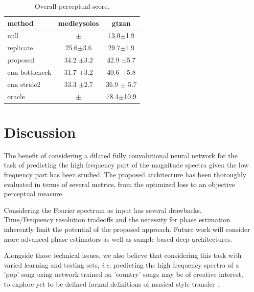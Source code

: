 \documentclass{article}
\newcommand{\fg}[1]{\textcolor{red}{FG : #1}}
\begin{document}
\begin{table}[t]
\begin{center}
\begin{tabular}{lcc}
method & medleysolos & gtzan \\
\hline
null & $\pm$ & 13.0$\pm$1.9  \\
replicate & 25.6$\pm$3.6 & 29.7$\pm$4.9 \\
\hline
proposed & 34.2 $\pm$3.2 & 42.9 $\pm$5.7 \\
cnn-bottleneck & 31.7 $\pm$3.2 & 40.6 $\pm$5.8 \\
cnn stride2 & 33.3 $\pm$2.7 & 36.9 $\pm$ 5.7 \\
\hline
oracle  & $\pm$ & 78.4$\pm$10.9  \\
\end{tabular}
\caption{Overall perceptual score.}
\end{center}
\label{tab:ops}
\vspace{-4mm}
\end{table}

\section{Discussion}
\label{sec:discussion}

The benefit of considering a dilated fully convolutional neural network for the task of predicting the high frequency part of the magnitude spectra given the low frequency part has been studied. The proposed architecture has been thoroughly evaluated in terms of several metrics, from the optimized loss to an objective perceptual measure.

Considering the Fourier spectrum as input has several drawbacks. Time/Frequency resolution tradeoffs and the necessity for phase estimation inherently limit the potential of the proposed approach. Future work will consider more advanced phase estimators as well as sample based deep architectures. %




Alongside those technical issues, we also believe that considering this task with varied learning and testing sets, \textit{i.e.} predicting the high frequency spectra of a 'pop' song using network trained on 'country' songs may be of creative interest, to explore yet to be defined formal definitions of musical style transfer \cite{dai2018music}.


\vfill\pagebreak




\end{document}
